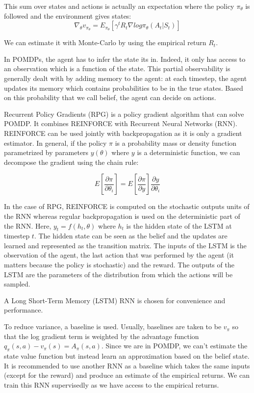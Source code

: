 \documentclass{article} %
\begin{document}
This sum over states and actions is actually an expectation where the policy $\pi_{\theta}$ is followed and the environment gives states:
$$
\nabla_{\theta} v_{\pi_{\theta}} = E_{\pi_{\theta}}[\gamma^t R_t \nabla log \pi_{\theta}(A_t|S_t)] %
$$

We can estimate it with Monte-Carlo by using the empirical return $R_t$.


In POMDPs, the agent has to infer the state its in. Indeed, it only has access to an observation which is a function of the state. This partial observability is generally dealt with by adding memory to the agent: at each timestep, the agent updates its memory which contains probabilities to be in the true states. Based on this probability that we call belief, the agent can decide on actions. 

Recurrent Policy Gradients\cite{wierstra2010recurrent} (RPG) is a policy gradient algorithm that can solve POMDP. It combines REINFORCE with Recurrent Neural Networks (RNN). REINFORCE can be used jointly with backpropagation as it is only a gradient estimator\cite{williams1992simple}. In general, if the policy $\pi$ is a probability mass or density function parametrized by parameters $y(\theta)$ where $y$ is a deterministic function, we can decompose the gradient using the chain rule:

$$ E[\frac{\partial \pi}{\partial \theta_i}] = E[\frac{\partial \pi}{\partial y}] \frac{\partial y}{\partial \theta_{i}} $$

In the case of RPG, REINFORCE is computed on the stochastic outputs units of the RNN whereas regular backpropagation is used on the deterministic part of the RNN. Here, $y_t = f(h_t, \theta)$ where $h_t$ is the hidden state of the LSTM at timestep $t$. The hidden state can be seen as the belief and the updates are learned and represented as the transition matrix. The inputs of the LSTM is the observation of the agent, the last action that was performed by the agent (it matters because the policy is stochastic) and the reward. The outputs of the LSTM are the parameters of the distribution from which the actions will be sampled.

A Long Short-Term Memory\cite{hochreiter1997long} (LSTM) RNN is chosen for convenience and performance. 

To reduce variance, a baseline is used. Usually, baselines are taken to be $v_{\pi}$ so that the log gradient term is weighted by the advantage function $q_{\pi}(s,a) - v_{\pi}(s) = A_{\pi}(s,a)$. Since we are in POMDP, we can't estimate the state value function but instead learn an approximation based on the belief state. It is recommended to use another RNN as a baseline which takes the same inputs (except for the reward) and produce an estimate of the empirical returns. We can train this RNN supervisedly as we have access to the empirical returns.
\end{document}
